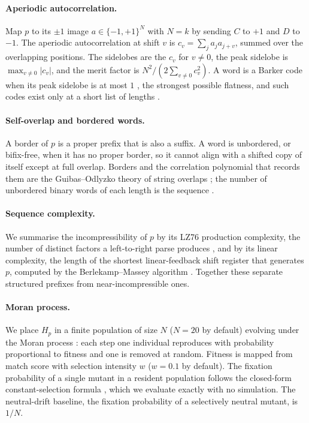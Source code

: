 \paragraph{Aperiodic autocorrelation.}
Map $p$ to its $\pm1$ image $a\in\{-1,+1\}^N$ with $N=k$ by sending $C$ to $+1$
and $D$ to $-1$. The aperiodic autocorrelation at shift $v$ is
$c_v=\sum_j a_j a_{j+v}$, summed over the overlapping positions. The sidelobes
are the $c_v$ for $v\neq 0$, the peak sidelobe is $\max_{v\neq 0}|c_v|$, and the
merit factor is $N^2/(2\sum_{v\neq 0} c_v^2)$. A word is a Barker code when its
peak sidelobe is at most $1$ \citep{barker1953}, the strongest possible
flatness, and such codes exist only at a short list of lengths
\citep{turyn1961}.

\paragraph{Self-overlap and bordered words.}
A border of $p$ is a proper prefix that is also a suffix. A word is unbordered,
or bifix-free, when it has no proper border, so it cannot align with a shifted
copy of itself except at full overlap. Borders and the correlation polynomial
that records them are the Guibas--Odlyzko theory of string overlaps
\citep{guibas1981}; the number of unbordered binary words of each length is the
sequence \citep{oeisA003000}.

\paragraph{Sequence complexity.}
We summarise the incompressibility of $p$ by its LZ76 production complexity, the
number of distinct factors a left-to-right parse produces \citep{lempel1976}, and
by its linear complexity, the length of the shortest linear-feedback shift
register that generates $p$, computed by the Berlekamp--Massey algorithm
\citep{massey1969}. Together these separate structured prefixes from
near-incompressible ones.

\paragraph{Moran process.}
We place $H_p$ in a finite population of size $N$ ($N=20$ by default) evolving
under the Moran process \citep{moran1958}: each step one individual reproduces
with probability proportional to fitness and one is removed at random. Fitness is
mapped from match score with selection intensity $w$ ($w=0.1$ by default). The
fixation probability of a single mutant in a resident population follows the
closed-form constant-selection formula \citep{nowak2004}, which we evaluate
exactly with no simulation. The neutral-drift baseline, the fixation probability
of a selectively neutral mutant, is $1/N$.
